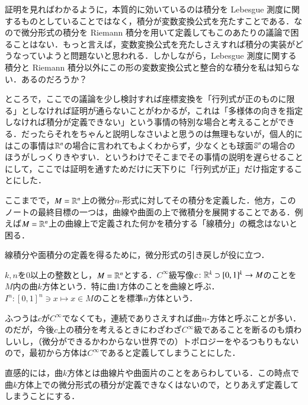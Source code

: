 \begin{dig}
証明を見ればわかるように，本質的に効いているのは積分を Lebesgue 測度に関するものとしていることではなく，積分が変数変換公式を充たすことである．なので微分形式の積分を Riemann 積分を用いて定義してもこのあたりの議論で困ることはない．もっと言えば，変数変換公式を充たしさえすれば積分の実装がどうなっていようと問題ないと思われる．しかしながら，Lebesgue 測度に関する積分と Riemann 積分以外にこの形の変数変換公式と整合的な積分を私は知らない．あるのだろうか？
\end{dig}


\begin{dig}
ところで，ここでの議論を少し検討すれば座標変換を「行列式が正のものに限る」としなければ証明が通らないことがわかるが，これは「多様体の向きを指定しなければ積分が定義できない」という事情の特別な場合と考えることができる．だったらそれをちゃんと説明しなさいよと思うのは無理もないが，個人的にはこの事情は$\mathbb{R}^n$の場合に言われてもよくわからず，少なくとも球面$\mathbb{S}^n$の場合のほうがしっくりきやすい．というわけでそこまでその事情の説明を遅らせることにして，ここでは証明を通すためだけに天下りに「行列式が正」だけ指定することにした．
\end{dig}

ここまでで，$M=\mathbb{R}^n$上の微分$n$-形式に対してその積分を定義した．他方，このノートの最終目標の一つは，曲線や曲面の上で微積分を展開することである．例えば$M=\mathbb{R}^n$上の曲線上で定義された何かを積分する「線積分」の概念はないと困る．

線積分や面積分の定義を得るために，微分形式の引き戻しが役に立つ．

\begin{defi}
$k,n$を0以上の整数とし，$M=\mathbb{R}^n$とする．$C^\infty$級写像$c \colon \mathbb{R}^k \supset [0,1]^k \to M$のことを$M$内の曲$k$方体という．特に曲1方体のことを曲線と呼ぶ．$I^n \colon [0,1]^n \ni x \mapsto x \in M$のことを標準$n$方体という．
\end{defi}

\begin{dig}
ふつうは$c$が$C^\infty$でなくても，連続でありさえすれば曲$n$-方体と呼ぶことが多い．のだが，今後$c$上の積分を考えるときにわざわざ$C^\infty$級であることを断るのも煩わしいし，（微分ができるかわからない世界での）トポロジーをやるつもりもないので，最初から方体は$C^\infty$であると定義してしまうことにした．
\end{dig}

直感的には，曲$k$方体とは曲線片や曲面片のことをあらわしている．この時点で曲$k$方体上での微分形式の積分が定義できなくはないので，とりあえず定義してしまうことにする．

